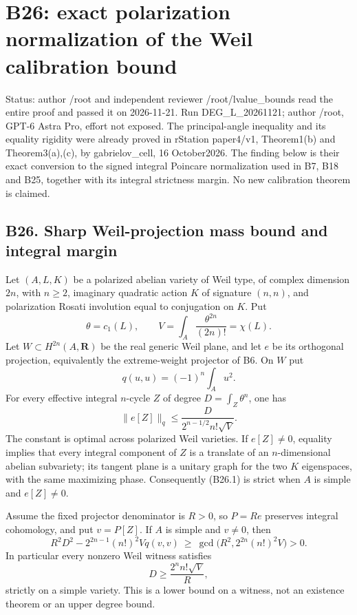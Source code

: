 \providecommand{\tightlist}{\setlength{\itemsep}{0pt}\setlength{\parskip}{0pt}}
\section{B26: exact polarization normalization of the Weil calibration bound}\label{b26-exact-polarization-normalization-of-the-weil-calibration-bound}

Status: author /root and independent reviewer /root/lvalue\_bounds read the entire proof and passed it on 2026-11-21. Run DEG\_L\_20261121; author /root, GPT-6 Astra Pro, effort not exposed. The principal-angle inequality and its equality rigidity were already proved in rStation paper4/v1, Theorem1(b) and Theorem3(a),(c), by gabrielov\_cell, 16 October2026. The finding below is their exact conversion to the signed integral Poincare normalization used in B7, B18 and B25, together with its integral strictness margin. No new calibration theorem is claimed.

\subsection{B26. Sharp Weil-projection mass bound and integral margin}\label{b26.-sharp-weil-projection-mass-bound-and-integral-margin}

Let \((A,L,K)\) be a polarized abelian variety of Weil type, of complex dimension \(2n\), with \(n\ge2\), imaginary quadratic action \(K\) of signature \((n,n)\), and polarization Rosati involution equal to conjugation on \(K\). Put \[
 \theta=c_1(L),\qquad V=\int_A\frac{\theta^{2n}}{(2n)!}=\chi(L).
\] Let \(W\subset H^{2n}(A,\mathbf R)\) be the real generic Weil plane, and let \(e\) be its orthogonal projection, equivalently the extreme-weight projector of B6. On \(W\) put \[
 q(u,u)=(-1)^n\int_Au^2.
\] For every effective integral \(n\)-cycle \(Z\) of degree \(D=\int_Z\theta^n\), one has \[
 \boxed{\quad
 \|e[Z]\|_q\le
 \frac{D}{2^{n-1/2}n!\sqrt V}.
 \quad}
 \tag{B26.1}
\] The constant is optimal across polarized Weil varieties. If \(e[Z]\ne0\), equality implies that every integral component of \(Z\) is a translate of an \(n\)-dimensional abelian subvariety; its tangent plane is a unitary graph for the two \(K\) eigenspaces, with the same maximizing phase. Consequently (B26.1) is strict when \(A\) is simple and \(e[Z]\ne0\).

Assume the fixed projector denominator is \(R>0\), so \(P=Re\) preserves integral cohomology, and put \(v=P[Z]\). If \(A\) is simple and \(v\ne0\), then \[
 R^2D^2-2^{2n-1}(n!)^2Vq(v,v)
 \ \ge\ \gcd\bigl(R^2,2^{2n}(n!)^2V\bigr)>0.
 \tag{B26.2}
\] In particular every nonzero Weil witness satisfies \[
 D\ge\frac{2^n n!\sqrt V}{R},
 \tag{B26.3}
\] strictly on a simple variety. This is a lower bound on a witness, not an existence theorem or an upper degree bound.

